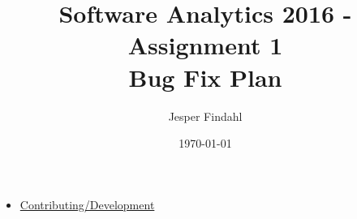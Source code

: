 \documentclass[11pt]{article}
\begin{document}
\title{\Large Software Analytics 2016 - Assignment 1 \\\vspace{0.7cm} \huge Bug Fix Plan}
\date{\today}
\author{Jesper Findahl}
\maketitle
\thispagestyle{empty}




\begin{itemize}
  \item \href{https://github.com/jeppe-style/dropwizard/blob/master/CONTRIBUTING.md}{Contributing/Development}
\end{itemize}
\end{document}
